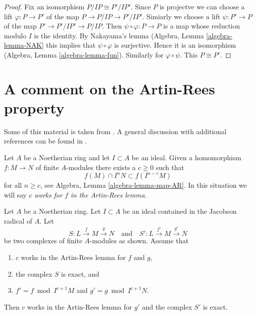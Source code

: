 \begin{proof}
Fix an isomorphism $P/IP \cong P'/IP'$.
Since $P$ is projectve we can choose a lift $\varphi : P \to P'$ of the map
$P \to P/IP \to P'/IP'$. Simiarly we choose a lift $\psi : P' \to P$
of the map $P' \to P'/IP' \to P/IP$. Then $\psi \circ \varphi : P \to P$
is a map whose reduction modulo $I$ is the identity. By Nakayama's lemma
(Algebra, Lemma \ref{algebra-lemma-NAK} this implies that
$\psi \circ \varphi$ is surjective. Hence it is an isomorphism
(Algebra, Lemma \ref{algebra-lemma-fun}). Similarly for
$\varphi \circ \psi$. This $P \cong P'$.
\end{proof}




\section{A comment on the Artin-Rees property}
\label{section-artin-rees}

\noindent
Some of this material is taken from \cite{conrad-dejong}. A general
discussion with additional references can be found in
\cite[Section 1]{Eis}.

\medskip\noindent
Let $A$ be a Noetherian ring and let $I \subset A$ be an ideal. Given a
homomorphism $f : M \to N$ of finite $A$-modules there exists a $c \geq 0$
such that
$$
f(M) \cap I^nN \subset f(I^{n - c}M)
$$
for all $n \geq c$, see Algebra, Lemma \ref{algebra-lemma-map-AR}. In this
situation we will say {\it $c$ works for $f$ in the Artin-Rees lemma}.

\begin{lemma}
\label{lemma-approximate-complex}
Let $A$ be a Noetherian ring. Let $I \subset A$ be an ideal contained in
the Jacobson radical of $A$. Let
$$
S : L \xrightarrow{f} M \xrightarrow{g} N
\quad\text{and}\quad
S' : L \xrightarrow{f'} M \xrightarrow{g'} N
$$
be two complexes of finite $A$-modules as shown. Assume that
\begin{enumerate}
\item $c$ works in the Artin-Rees lemma for $f$ and $g$,
\item the complex $S$ is exact, and
\item $f' = f \bmod I^{c + 1}M$ and $g' = g \bmod I^{c + 1}N$.
\end{enumerate}
Then $c$ works in the Artin-Rees lemma for $g'$ and the
complex $S'$ is exact.
\end{lemma}

